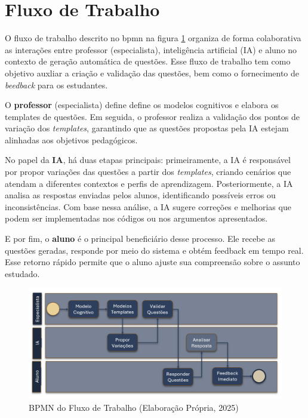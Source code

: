     
\section{Fluxo de Trabalho}

O fluxo de trabalho descrito no \gls{bpmn} na figura \ref{fig:bpmn-fluxo} organiza de forma colaborativa as interações entre professor (especialista), inteligência artificial (IA) e aluno no contexto de geração automática de questões. Esse fluxo de trabalho tem como objetivo auxliar a criação e validação das questões, bem como o fornecimento de \textit{beedback} para os estudantes. 

O \textbf{professor} (especialista) define define os modelos cognitivos  e elabora os templates de questões. Em seguida, o professor realiza a validação dos pontos de variação dos \textit{templates}, garantindo que as questões propostas pela IA estejam alinhadas aos objetivos pedagógicos.

No papel da \textbf{IA}, há duas etapas principais: primeiramente, a IA é responsável por propor variações das questões a partir dos \textit{templates}, criando cenários  que atendam a diferentes contextos e perfis de aprendizagem. Posteriormente, a IA analisa as respostas enviadas pelos alunos, identificando possíveis erros ou inconsistências. Com base nessa análise, a IA sugere correções e melhorias que podem ser implementadas nos códigos ou nos argumentos apresentados.

E por fim, o \textbf{aluno} é o principal beneficiário desse processo. Ele recebe as questões geradas, responde por meio do sistema e obtém feedback em tempo real. Esse retorno rápido permite que o aluno ajuste sua compreensão sobre o assunto estudado. 

\begin{figure}[ht]
	\centering
	\includegraphics[width=16cm]{./imagens/capitulo6/bpmn-fluxo}
	\caption{BPMN do Fluxo de Trabalho (Elaboração Própria, 2025) }
	\label{fig:bpmn-fluxo}
\end{figure}